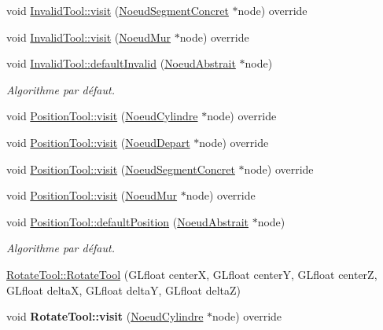 \begin{DoxyCompactItemize}
\item 
void \hyperlink{group__inf2990_ga2f8397c63d7f895906f49ab95de03f13}{Invalid\+Tool\+::visit} (\hyperlink{class_noeud_segment_concret}{Noeud\+Segment\+Concret} $\ast$node) override
\item 
void \hyperlink{group__inf2990_gab69a438cb8d2abff211cd450c9f946f5}{Invalid\+Tool\+::visit} (\hyperlink{class_noeud_mur}{Noeud\+Mur} $\ast$node) override
\item 
void \hyperlink{group__inf2990_gafb96baa12cb0df8c48c84dd12badd757}{Invalid\+Tool\+::default\+Invalid} (\hyperlink{class_noeud_abstrait}{Noeud\+Abstrait} $\ast$node)
\begin{DoxyCompactList}\small\item\em Algorithme par défaut. \end{DoxyCompactList}\item 
void \hyperlink{group__inf2990_gac1643483872455c76ef059ac67ae6d04}{Position\+Tool\+::visit} (\hyperlink{class_noeud_cylindre}{Noeud\+Cylindre} $\ast$node) override
\item 
void \hyperlink{group__inf2990_ga25f3c9e1decf3bf95d1e7491a2668565}{Position\+Tool\+::visit} (\hyperlink{class_noeud_depart}{Noeud\+Depart} $\ast$node) override
\item 
void \hyperlink{group__inf2990_ga48b51161058393ca12df07c9d28197a7}{Position\+Tool\+::visit} (\hyperlink{class_noeud_segment_concret}{Noeud\+Segment\+Concret} $\ast$node) override
\item 
void \hyperlink{group__inf2990_gaf80e360d0e162b7075f5272e5860f60f}{Position\+Tool\+::visit} (\hyperlink{class_noeud_mur}{Noeud\+Mur} $\ast$node) override
\item 
void \hyperlink{group__inf2990_ga805981677e352dd98b018d04376bb6eb}{Position\+Tool\+::default\+Position} (\hyperlink{class_noeud_abstrait}{Noeud\+Abstrait} $\ast$node)
\begin{DoxyCompactList}\small\item\em Algorithme par défaut. \end{DoxyCompactList}\item 
\hyperlink{group__inf2990_ga53087375f63f0e400fdd0bf569e90ad0}{Rotate\+Tool\+::\+Rotate\+Tool} (G\+Lfloat center\+X, G\+Lfloat center\+Y, G\+Lfloat center\+Z, G\+Lfloat delta\+X, G\+Lfloat delta\+Y, G\+Lfloat delta\+Z)
\item 
\hypertarget{group__inf2990_ga4142a7bdd90761c6dbda240a3fe62b5d}{}void {\bfseries Rotate\+Tool\+::visit} (\hyperlink{class_noeud_cylindre}{Noeud\+Cylindre} $\ast$node) override\label{group__inf2990_ga4142a7bdd90761c6dbda240a3fe62b5d}


\end{DoxyCompactItemize}
